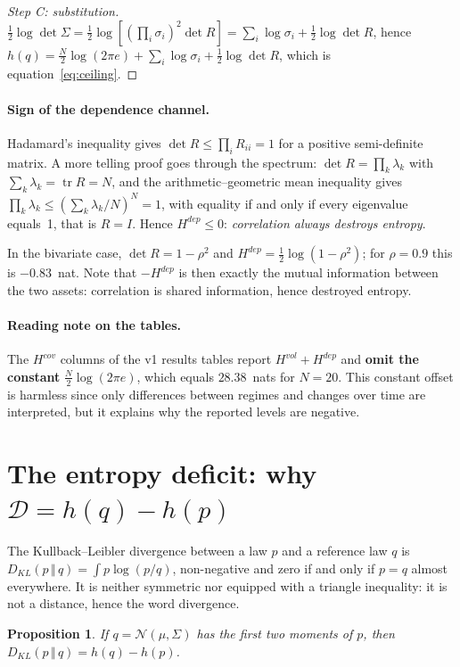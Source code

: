 \documentclass[11pt]{article}
\newtheorem{proposition}{Proposition}
\theoremstyle{definition}
\theoremstyle{remark}
\newcommand{\DD}{\mathcal{D}}
\newcommand{\KL}[2]{D_{KL}\!\left(#1\,\Vert\,#2\right)}
\begin{document}
\begin{proof}[Step C: substitution]
$\tfrac12\log\det\Sigma
=\tfrac12\log\!\left[\left(\prod_i\sigma_i\right)^2\det R\right]
=\sum_i\log\sigma_i+\tfrac12\log\det R$, hence
$h(q)=\tfrac N2\log(2\pi e)+\sum_i\log\sigma_i+\tfrac12\log\det R$, which is
equation~\eqref{eq:ceiling}.
\end{proof}

\paragraph{Sign of the dependence channel.} Hadamard's inequality gives
$\det R\le\prod_i R_{ii}=1$ for a positive semi-definite matrix. A more telling
proof goes through the spectrum: $\det R=\prod_k\lambda_k$ with
$\sum_k\lambda_k=\operatorname{tr}R=N$, and the arithmetic--geometric mean
inequality gives $\prod_k\lambda_k\le\left(\sum_k\lambda_k/N\right)^N=1$, with
equality if and only if every eigenvalue equals~1, that is $R=I$. Hence
$H^{dep}\le0$: \emph{correlation always destroys entropy}.

In the bivariate case, $\det R=1-\rho^2$ and $H^{dep}=\tfrac12\log(1-\rho^2)$;
for $\rho=0.9$ this is $-0.83$~nat. Note that $-H^{dep}$ is then exactly the
mutual information between the two assets: correlation is shared information,
hence destroyed entropy.

\paragraph{Reading note on the tables.} The $H^{cov}$ columns of the v1 results
tables report $H^{vol}+H^{dep}$ and \textbf{omit the constant}
$\tfrac N2\log(2\pi e)$, which equals $28.38$~nats for $N=20$. This constant
offset is harmless since only differences between regimes and changes over time
are interpreted, but it explains why the reported levels are negative.

\section{The entropy deficit: why $\DD=h(q)-h(p)$}
\label{app:deficit}

The Kullback--Leibler divergence between a law $p$ and a reference law $q$ is
$\KL{p}{q}=\int p\log(p/q)$, non-negative and zero if and only if $p=q$ almost
everywhere. It is neither symmetric nor equipped with a triangle inequality: it
is not a distance, hence the word divergence.

\begin{proposition}
\label{prop:deficit}
If $q=\mathcal N(\mu,\Sigma)$ has \emph{the first two moments of $p$}, then
$\KL{p}{q}=h(q)-h(p)$.
\end{proposition}
\end{document}
